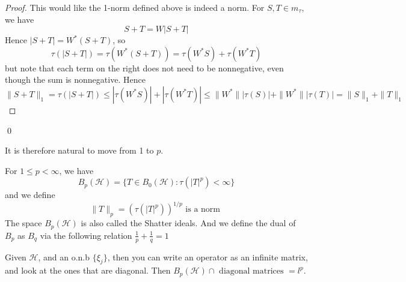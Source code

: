 \begin{proof}
    This would like the 1-norm defined above is indeed a norm. For $S,T\in m_\tau$, we have 
    \begin{equation*}
        S+T=W|S+T|
    \end{equation*} 
    Hence $|S+T|=W^*(S+T)$, so 
    \begin{equation*}
        \tau(|S+T|)=\tau(W^*(S+T))=\tau(W^*S)+\tau(W^*T)
    \end{equation*}
    but note that each term on the right does not need to be nonnegative, even though the sum is nonnegative. Hence 
    \begin{equation*}
        \|S+T\|_1=\tau(|S+T|)\leq|\tau(W^*S)|+|\tau(W^*T)|\leq\|W^*\||\tau(S)|+\|W^*\||\tau(T)|=\|S\|_1+\|T\|_1
    \end{equation*}
\end{proof}
\qed

It is therefore natural to move from 1 to $p$.
\begin{definition}
    For $1\leq p<\infty$, we have 
\begin{equation*}
    B_p(\mathcal{H})=\{T\in B_0(\mathcal{H}): \tau(|T|^p)<\infty\}
\end{equation*}
and we define 
\begin{equation*}
    \|T\|_p=(\tau(|T|^p))^{1/p} \text{ is a norm }
\end{equation*}
The space $B_p(\mathcal{H})$ is also called the Shatter ideals. And we define the dual of $B_p$ as $B_q$ via the following relation $\frac{1}{p}+\frac{1}{q}=1$
\end{definition}

Given $\mathcal{H}$, and an o.n.b $\{\xi_j\}$, then you can write an operator as an infinite matrix, and look at the ones that are diagonal. Then $B_p(\mathcal{H}) \cap \text{ diagonal matrices }=l^p$.

